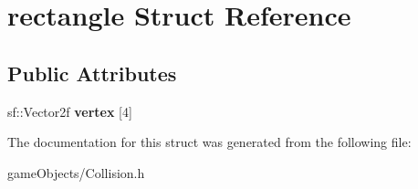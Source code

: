 \hypertarget{structrectangle}{\section{rectangle Struct Reference}
\label{structrectangle}
}
\subsection*{Public Attributes}
\begin{DoxyCompactItemize}
\item 
\hypertarget{structrectangle_ac176c27a596e17d74b8c79e5146e3606}{sf\+::\+Vector2f {\bfseries vertex} \mbox{[}4\mbox{]}}\label{structrectangle_ac176c27a596e17d74b8c79e5146e3606}

\end{DoxyCompactItemize}


The documentation for this struct was generated from the following file\+:\begin{DoxyCompactItemize}
\item 
game\+Objects/Collision.\+h\end{DoxyCompactItemize}
